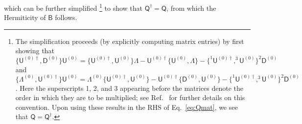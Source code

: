 %
which can be further simplified%
\footnote{%
  The simplification proceeds (by explicitly computing matrix entries) by first showing that
  $\{\mathsf{U}^{(0)\dagger}, \mathsf{D}^{(0)}\}\mathsf{U}^{(0)} = \{\mathsf{U}^{(0)\dagger}, \mathsf{U}^{(0)}\}\Lambda - \mathsf{U}^{(0)\dagger}\{\mathsf{U}^{(0)}, \Lambda\} - \{ ^{1}\mathsf{U}^{(0)\dagger}, ^{3}\mathsf{U}^{(0)}\}^{2}\mathsf{D}^{(0)}$
  and
  $\{\Lambda^{(0)}, \mathsf{U}^{(0)\dagger}\}\mathsf{U}^{(0)} = \Lambda^{(0)}\{\mathsf{U}^{(0)\dagger},\mathsf{U}^{(0)}\} - \mathsf{U}^{(0)\dagger}\{\mathsf{D}^{(0)},\mathsf{U}^{(0)}\} - \{^{1}\mathsf{U}^{(0)\dagger},^{3}\mathsf{U}^{(0)}\}^{2}\mathsf{D}^{(0)}$.
  Here the superscripts 1, 2, and 3 appearing before the matrices denote the order in which they are to be multiplied; see Ref.~\cite{littlejohn1991a} for further details on this convention.
  Upon using these results in the RHS of Eq.~\eqref{eq:Qmat}, we see that $\mathsf{Q}=\mathsf{Q}^{\dagger}$.
}
to show that $\mathsf{Q}^{\dagger} = \mathsf{Q}$, from which the Hermiticity of $\mathsf{B}$ follows.

